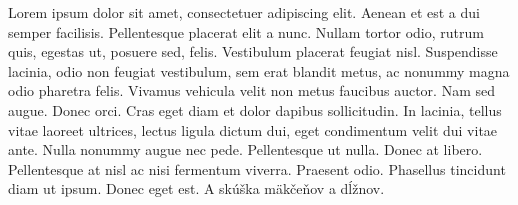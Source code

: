 Lorem ipsum dolor sit amet, consectetuer adipiscing elit. Aenean et est a dui semper facilisis. Pellentesque placerat elit a nunc. Nullam tortor odio, rutrum quis, egestas ut, posuere sed, felis. Vestibulum placerat feugiat nisl. Suspendisse lacinia, odio non feugiat vestibulum, sem erat blandit metus, ac nonummy magna odio pharetra felis. Vivamus vehicula velit non metus faucibus auctor. Nam sed augue. Donec orci. Cras eget diam et dolor dapibus sollicitudin. In lacinia, tellus vitae laoreet ultrices, lectus ligula dictum dui, eget condimentum velit dui vitae ante. Nulla nonummy augue nec pede. Pellentesque ut nulla. Donec at libero. Pellentesque at nisl ac nisi fermentum viverra. Praesent odio. Phasellus tincidunt diam ut ipsum. Donec eget est. A skúška mäkčeňov a dĺžnov.